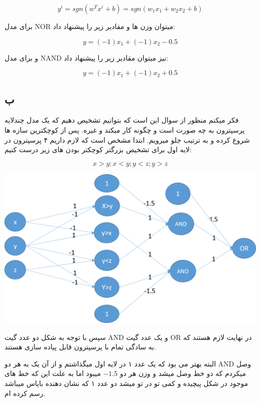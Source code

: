 \documentclass{article}[12pt]
\begin{document}
\begin{equation}
y^{i} = sgn(w^T x^{i}+b) = sgn(w_1 x_1 + w_2 x_2 + b)
\end{equation}

برای مدل NOR میتوان وزن ها و مقادیر زیر را پیشنهاد داد:

\begin{equation}
y = (-1) x_1 + (-1) x_2 -0.5
\end{equation}

و برای مدل 
NAND
نیز میتوان مقادیر زیر را پیشنهاد داد:

\begin{equation}
y = (-1) x_1 + (-1)x_2 +0.5
\end{equation}
\clearpage
\subsection{ب}
فکر میکنم منظور از سوال این است که بتوانیم تشخیص دهیم که یک مدل چندلایه پرسپترون به چه صورت است و چگونه کار میکند و غیره. پس از کوچکترین سازه ها شروع کرده و به ترتیب جلو میرویم. 
ابتدا مشخص است که لازم داریم ۴ پرسپترون در لایه اول برای تشخیص بزرگتر کوچکتر بودن های زیر درست کنیم:

\begin{equation}
x>y; x<y;y<z;y>z
\end{equation}

\includegraphics[scale=0.5]{NeuralNetwork.png} 

سپس با توجه به شکل دو عدد گیت AND
و یک عدد گیت 
OR 
در نهایت لازم هستند که به سادگی تمام با پرسپترون قابل پیاده سازی هستند. 

البته بهتر می بود که یک عدد ۱ در لایه اول میگذاشتم و از آن یک به هر دو AND وصل میکردم که دو خط وصل میشد و وزن هر دو 
$-1.5$
میبود اما به علت این که خط های موجود در شکل پیچیده و کمی تو در تو میشد دو عدد ۱ که نشان دهنده بایاس میباشد رسم کرده ام. 
\end{document}
